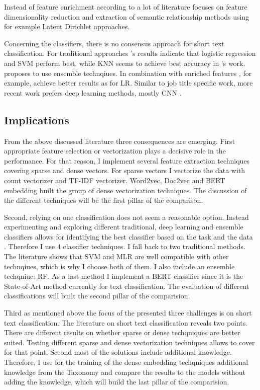\documentclass[12pt, a4paper, titlepage]{article}
\begin{document}
Instead of feature enrichment according to \citet{Song2014} a lot of literature focuses on feature dimensionality reduction and extraction of semantic relationship methods using for example Latent Dirichlet approaches. %

Concerning the classifiers, there is no consensus approach for short text classification. For traditional approaches \cite{WangY2017}'s results indicate that logistic regression and SVM perform best, while KNN seems to achieve best accuracy in \cite{Khamar2013}'s work. \citet{Song2014} proposes  to use ensemble technqiues. In combination with enriched features \citet{Bouaziz2014}, for example, achieve better results as for \ac{LR}. Similar to job title specific work, more recent work prefers deep learning methods, mostly CNN \citep{Chen2019}. 


\subsection{Implications}
From the above discussed literature three consequences are emerging. First appropriate feature selection or vectorization plays a decisive role in the performance. For that reason, I implement several feature extraction techniques covering sparse and dense vectors. For sparse vectors I vectorize the data with count vectorizer and \ac{TF-IDF} vectorizer. Word2vec, Doc2vec and BERT embedding built the group of dense vectorization techniques. The discussion of the different techniques will be the first pillar of the comparison. 

Second, relying on one classification does not seem a reasonable option.  Instead experimenting and exploring different traditional, deep learning and ensemble classifiers allows for identifying the best classifier based on the task and the data \citep{maglogiannis2007}. Therefore I use 4 classifier techniques. I fall back to two traditional methods. The literature shows that \ac{SVM} and \ac{MLR} are well compatible with other technqiues, which is why I choose both of them. I also include an ensemble techqniue: \ac{RF}. As a last method I implement a \ac{BERT} classifier since it is the State-of-Art method currently for text classification. The evaluation of different classifications will built the second pillar of the comparision. 

Third as mentioned above the focus of the presented three challenges is on short text classification. The literature on short text classification reveals two points. There are different results on whether sparse or dense techqniques are better suited. Testing different sparse and dense vectorization techniques allows to cover for that point. Second most of the solutions include additional knowledge. Therefore, I use for the training of the dense embedding techqniques additional knowledge from the Taxonomy and compare the results to the models without adding the knowledge, which will build the last pillar of the comparision. 
\end{document}
